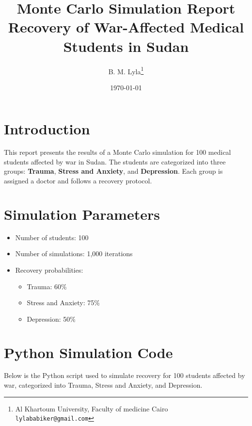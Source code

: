 \documentclass[12pt]{article}
\title{\textcolor{titleColor}{\textbf{\Huge \textbf{ Monte Carlo Simulation Report\\
Recovery of War-Affected Medical Students in Sudan }}}}
\author{B. M. Lyla\thanks{Al Khartoum University, Faculty of medicine  Cairo \\ \texttt{lylababiker@gmail.com}}}
\date{\today}
\begin{document}
\maketitle


\section*{Introduction}
This report presents the results of a Monte Carlo simulation for 100 medical students affected by war in Sudan. 
The students are categorized into three groups: \textbf{Trauma}, \textbf{Stress and Anxiety}, and \textbf{Depression}.
Each group is assigned a doctor and follows a recovery protocol.

\section*{Simulation Parameters}
\begin{itemize}
  \item Number of students: 100
  \item Number of simulations: 1,000 iterations
  \item Recovery probabilities:
  \begin{itemize}
    \item Trauma: 60\%
    \item Stress and Anxiety: 75\%
    \item Depression: 50\%
  \end{itemize}
\end{itemize}





\section*{Python Simulation Code}

Below is the Python script used to simulate recovery for 100 students affected by war, categorized into Trauma, Stress and Anxiety, and Depression.
\end{document}
